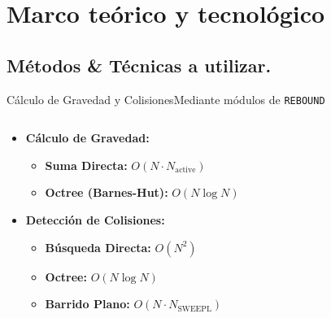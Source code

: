 \section[Marco del TT]{Marco teórico y tecnológico}
\subsection[Métodos \& Técnicas]{Métodos \& Técnicas a utilizar.}

\begin{frame}{Cálculo de Gravedad y Colisiones}{Mediante módulos de \texttt{REBOUND}}
    \begin{columns}
        \begin{column}{0.6\textwidth}
            \small
            \begin{itemize}
                \item \textbf{Cálculo de Gravedad:}
                \begin{itemize}
                    \item \textbf{Suma Directa:} $O(N \cdot N_{\text{active}})$
                    \item \textbf{Octree (Barnes-Hut):} $O(N \log N)$
                \end{itemize}
                \item \textbf{Detección de Colisiones:}
                \begin{itemize}
                    \item \textbf{Búsqueda Directa:} $O(N^2)$
                    \item \textbf{Octree:} $O(N \log N)$
                    \item \textbf{Barrido Plano:} $O(N \cdot N_{\text{SWEEPL}})$
                \end{itemize}
            \end{itemize}
        \end{column}
        \begin{column}{0.4\textwidth}
            \centering
            \begin{figure}[H]
                \centering
\end{figure}
\end{column}
\end{columns}
\end{frame}
